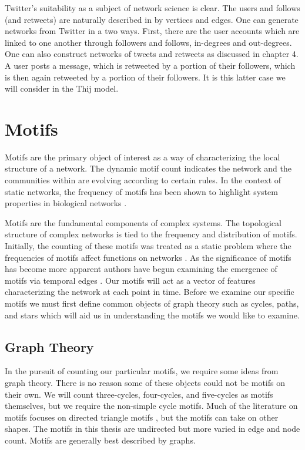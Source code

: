 Twitter's suitability as a subject of network science is clear. The users and follows (and retweets) are naturally 
described in by vertices and edges. One can generate networks from Twitter in a two ways.
 First, there are the user accounts which are linked to one another through 
followers and follows, in-degrees and out-degrees. One can also construct networks
of tweets and retweets as discussed in chapter 4. A user posts a message, which is  
retweeted by a portion of their followers, which is then again retweeted by a portion of their followers.
 It is this latter case we will consider in the Thij model.

\chapter{Motifs}
\label{section:Motifs}

Motifs are the primary object of interest as a way of characterizing the local structure of a
network. The dynamic motif count indicates the network and the communities within are evolving according to certain rules.
In the context of static networks, the frequency of motifs 
has been shown to highlight system properties in biological networks \cite{biomotif} \cite{bioAlbert}.

Motifs are the fundamental components of complex systems.
The topological structure of complex networks
is tied to the frequency and distribution of motifs. Initially, the counting of 
these motifs was treated as a static problem where the frequencies of motifs affect functions on networks \cite{motifdiscovery}.
As the significance of motifs has become more apparent authors have begun examining the emergence of motifs 
via temporal edges \cite{temporalmotifs}. Our motifs will
act as a vector of features characterizing the network at each point in time. Before we
examine our specific motifs we must first define common objects of graph theory such as cycles, paths, and stars
which will aid us in understanding the motifs we would like to examine.

\section{Graph Theory}

In the pursuit of counting our particular motifs, we require some
ideas from graph theory. There is no reason some of these objects could not be 
motifs on their own. We will count three-cycles, four-cycles, and five-cycles
as motifs themselves, but we require the non-simple cycle motifs.
Much of the literature on motifs focuses on directed triangle motifs \cite{temporalmotifs} \cite{Milo824} \cite{Interactome}, but 
 the motifs can take on other shapes. The motifs in this thesis are undirected but more varied in edge and node count.
Motifs are generally best described by graphs. 

